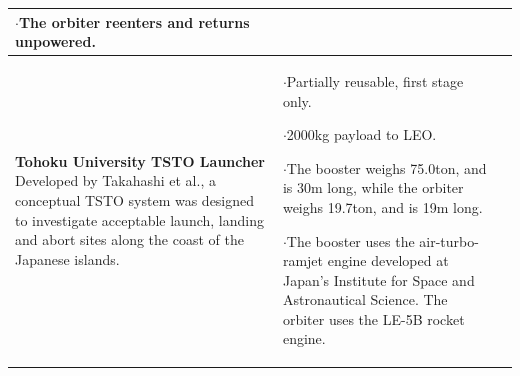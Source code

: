 {\begin{landscape}
\begin{xltabular}{\linewidth}{|X|X|X|}
	$\cdot$The orbiter reenters and returns unpowered. 
	
	\\
	\hline \small 
	\textbf{Tohoku University TSTO Launcher}\cite{Takahashi1997}\newline\newline
	Developed by Takahashi et al.\cite{Takahashi1997}, a conceptual TSTO system was designed to investigate acceptable launch, landing and abort sites along the coast of the Japanese islands. 
	&\small
	
	$\cdot$Partially reusable, first stage only. 
	
	$\cdot$2000kg payload to LEO. 
	
	$\cdot$The booster weighs 75.0ton, and is 30m long, while the orbiter weighs 19.7ton, and is 19m long.
	
	$\cdot$The booster uses the air-turbo-ramjet engine developed at Japan's Institute for Space and Astronautical Science. The orbiter uses the LE-5B rocket engine. 
	

\end{xltabular}
\end{landscape}}
